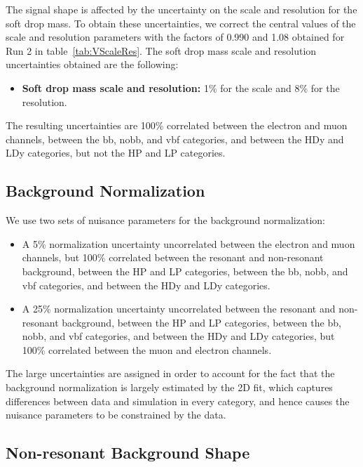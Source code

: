 The \MJ signal shape is affected by the uncertainty on the scale and resolution for the soft drop mass.
To obtain these uncertainties, we correct the central values of the \MJ scale and resolution parameters with the factors of 0.990 and 1.08 obtained for Run 2 in table~\ref{tab:VScaleRes}.
The soft drop mass scale and resolution uncertainties obtained are the following:
\begin{itemize}
  \item {\bfseries Soft drop mass scale and resolution:} 1\% for the scale and 8\% for the resolution.
\end{itemize}
The resulting uncertainties are 100\% correlated between the electron and muon channels, between the bb, nobb, and vbf categories, and between the HDy and LDy categories, but not the HP and LP categories.

\subsection{Background Normalization}

We use two sets of nuisance parameters for the background normalization:
\begin{itemize}
  \item A 5\% normalization uncertainty uncorrelated between the electron and muon channels, but 100\% correlated between the resonant and non-resonant background, between the HP and LP categories, between the bb, nobb, and vbf categories, and between the HDy and LDy categories.
  \item A 25\% normalization uncertainty uncorrelated between the resonant and non-resonant background, between the HP and LP categories, between the bb, nobb, and vbf categories, and between the HDy and LDy categories, but 100\% correlated between the muon and electron channels.
\end{itemize}
The large uncertainties are assigned in order to account for the fact that the background normalization is largely estimated by the 2D fit, which captures differences between data and simulation in every category, and hence causes the nuisance parameters to be constrained by the data.

\subsection{Non-resonant Background Shape}

